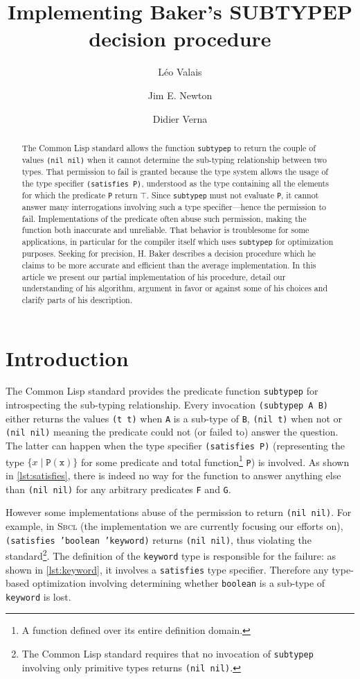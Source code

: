 \documentclass[format=sigconf]{acmart}
\title{Implementing Baker's SUBTYPEP decision procedure}
\author{Léo Valais}
\author{Jim E. Newton}
\author{Didier Verna}
\affiliation{%
  \institution{EPITA/LRDE}
  \streetaddress{14-16 rue Voltaire}
  \postcode{94270}
  \city{Le Kremlin-Bic{\^e}tre}
  \country{France}
}
\newcommand\code[2][\small]{\sloppy\texttt{#1#2}}
\newcommand\footcode[1]{\code[\scriptsize]{#1}}
\theoremstyle{definition}
\newcommand\sbcl{\textsc{Sbcl}}
\begin{document}
\begin{abstract}
  The Common Lisp standard allows the function \code{subtypep} to return
  the couple of values \code{(nil nil)} when it cannot determine the
  sub-typing relationship between two types. That permission to fail
  is granted because the type system allows the usage of the type specifier
  \code{(satisfies P)}, understood as the type containing all the
  elements for which the predicate \code{P} return $\top$. Since \code{subtypep}
  must not evaluate \code{P}, it cannot answer many interrogations involving
  such a type specifier---hence the permission to fail. Implementations of the
  predicate often abuse such permission, making the function both inaccurate and
  unreliable. That behavior is troublesome for some applications, in particular
  for the compiler itself which uses \code{subtypep} for optimization purposes.
  Seeking for precision, H. Baker describes a decision procedure which he claims
  to be more accurate and efficient than the average implementation.
  In this article we present our partial implementation of his procedure, detail
  our understanding of his algorithm, argument in favor or against some of
  his choices and clarify parts of his description.
\end{abstract}

\maketitle

\section{Introduction}
The Common Lisp standard \cite{bib:ansi.94.cl} provides the predicate function
\code{subtypep} for
introspecting the sub-typing relationship. Every invocation \code{(subtypep A B)}
either returns the values \code{(t t)} when \code{A} is a sub-type of \code{B},
\code{(nil t)} when not or \code{(nil nil)} meaning the predicate could not
(or failed to) answer the question. The latter can happen when the type
specifier \code{(satisfies P)} (representing the type $\{x \mid
\mathtt{P(x)}\}$ for some predicate and total function\footnote{A function
  defined over its entire definition domain.} \code{P}) is involved. As shown in
\vref{lst:satisfies}, there is indeed no way for the function to answer anything
else than \code{(nil nil)} for any arbitrary predicates \code{F} and \code{G}.

However some implementations abuse of the permission to return \code{(nil nil)}.
For example, in \sbcl{} (the implementation we are currently focusing our
efforts on), {\small\code{(satisfies 'boolean 'keyword)}} returns
\code{(nil nil)}, thus violating the standard\footnote{The Common Lisp standard
  requires that no invocation of \footcode{subtypep} involving only primitive types
  returns \footcode{(nil nil)}.}. The definition of the \code{keyword} type is
responsible for the failure: as shown in \vref{lst:keyword}, it
involves a \code{satisfies} type specifier. Therefore any type-based
optimization involving determining whether \code{boolean} is a sub-type of
\code{keyword} is lost.
\end{document}
